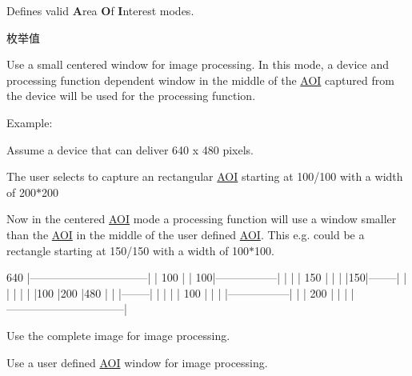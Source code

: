 Defines valid {\bfseries A}rea {\bfseries O}f {\bfseries I}nterest modes. 

\begin{Desc}
\item[枚举值]\par
\begin{description}
\item[{\em 
\hypertarget{group___common_interface_ggae7940d967323243f7d4ebdb5cc8045cbae9642ac2013fd67c8a0bd7a6bc59c437}{am\+Centered}\label{group___common_interface_ggae7940d967323243f7d4ebdb5cc8045cbae9642ac2013fd67c8a0bd7a6bc59c437}
}]Use a small centered window for image processing. In this mode, a device and processing function dependent window in the middle of the \hyperlink{struct_a_o_i}{A\+O\+I} captured from the device will be used for the processing function.

Example\+:


\begin{DoxyItemize}
\item Assume a device that can deliver 640 x 480 pixels.
\item The user selects to capture an rectangular \hyperlink{struct_a_o_i}{A\+O\+I} starting at 100/100 with a width of 200$\ast$200
\end{DoxyItemize}

Now in the centered \hyperlink{struct_a_o_i}{A\+O\+I} mode a processing function will use a window smaller than the \hyperlink{struct_a_o_i}{A\+O\+I} in the middle of the user defined \hyperlink{struct_a_o_i}{A\+O\+I}. This e.\+g. could be a rectangle starting at 150/150 with a width of 100$\ast$100.


\begin{DoxyCode}
           640
|--------------------------------|
|    100                         |
| 100|-----------------|         |
|    |   150           |         |
|    |150|--------|    |         |
|    |   |        |100 |200      |480
|    |   |--------|    |         |
|    |      100        |         |
|    |-----------------|         |
|           200                  |
|                                |
|--------------------------------|
\end{DoxyCode}
 \item[{\em 
\hypertarget{group___common_interface_ggae7940d967323243f7d4ebdb5cc8045cba5421f4831311942964431b576460e231}{am\+Full}\label{group___common_interface_ggae7940d967323243f7d4ebdb5cc8045cba5421f4831311942964431b576460e231}
}]Use the complete image for image processing. \item[{\em 
\hypertarget{group___common_interface_ggae7940d967323243f7d4ebdb5cc8045cba7d283190ce147f8720e13b8f5db30bd4}{am\+Use\+Aoi}\label{group___common_interface_ggae7940d967323243f7d4ebdb5cc8045cba7d283190ce147f8720e13b8f5db30bd4}
}]Use a user defined \hyperlink{struct_a_o_i}{A\+O\+I} window for image processing. \end{description}
\end{Desc}
